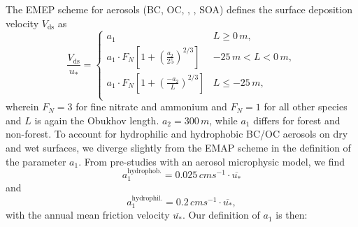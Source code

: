 \documentclass[gmd, manuscript]{copernicus}
\begin{document}
The EMEP scheme for aerosols (BC, OC, , , SOA) defines the surface deposition velocity $V_\text{ds}$ as
\begin{equation}
  \frac{V_\text{ds}}{u_*} =
  \begin{cases}
    a_1 &  L \ge 0\,\unit{m}, \\
    a_1 \cdot F_N \left[ 1 + \left(\frac{a_2}{25}\right)^{2/3}\right]& -25\,\unit{m} < L < 0\,\unit{m}, \\
    a_1 \cdot F_N \left[ 1 + \left(\frac{-a_2}{L}\right)^{2/3}\right]& L \le -25\,\unit{m}, \\
  \end{cases}
\end{equation}
wherein $F_N = 3$ for fine nitrate and ammonium and $F_N = 1$ for all other species and $L$ is again the Obukhov length. $a_2 = 300\,\unit{m}$, while $a_1$ differs for forest and non-forest. To account for hydrophilic and hydrophobic BC/OC aerosols on dry and wet surfaces, we diverge slightly from the EMAP scheme in the definition of the parameter $a_1$. From pre-studies with an aerosol microphysic model, we find
\begin{equation}
  a_1^\text{hydrophob.} = 0.025\,\unit{cms^{-1}} \cdot \overline{u_*}
\end{equation}
and
\begin{equation} 
  a_1^\text{hydrophil.} = 0.2\,\unit{cms^{-1}} \cdot \overline{u_*},
\end{equation}
with the annual mean friction velocity $\overline{u_*}$. Our definition of $a_1$ is then:
\end{document}
